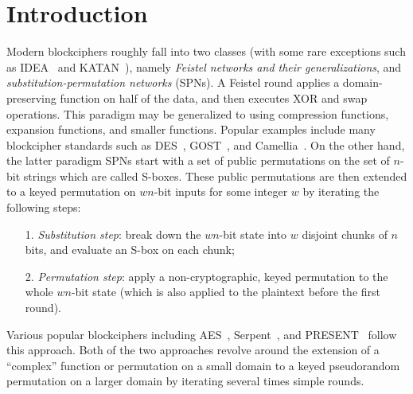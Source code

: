 
\section{Introduction}
\label{section:Introduction}

Modern blockciphers roughly fall into two classes (with some rare exceptions such as IDEA~\cite{EC:LaiMas90} and KATAN~\cite{CHES:DeCDunKne09}), namely {\it Feistel networks and their generalizations}, and {\it substitution-permutation networks} (SPNs). A Feistel round applies a domain-preserving function on half of the data, and then executes XOR and swap operations. This paradigm may be generalized to using compression functions, expansion functions, and smaller functions. Popular examples include many blockcipher standards such as DES~\cite{DESDesign}, GOST~\cite{GOSTDesign}, and Camellia~\cite{ISOIEC-18033-3:2010}. On the other hand, the latter paradigm SPNs start with a set of public permutations on the set of $n$-bit strings which are called S-boxes. These public permutations are then extended to a keyed permutation on $wn$-bit inputs for some integer $w$ by iterating the following steps:
\begin{enumerate}
	\item[1.] {\it Substitution step}: break down the $wn$-bit state into $w$ disjoint chunks of $n$ bits, and evaluate an S-box on each chunk;
	\item[2.] {\it Permutation step}: apply a non-cryptographic, keyed permutation to the whole $wn$-bit state (which is also applied to the plaintext before the first round).
\end{enumerate}
Various popular blockciphers including AES~\cite{AESDesign}, Serpent~\cite{serpentProposal}, and PRESENT~\cite{CHES:BKLPPR07} follow this approach. Both of the two approaches revolve around the extension of a ``complex'' function or permutation on a small domain to a keyed pseudorandom permutation on a larger domain by iterating several times simple rounds.



